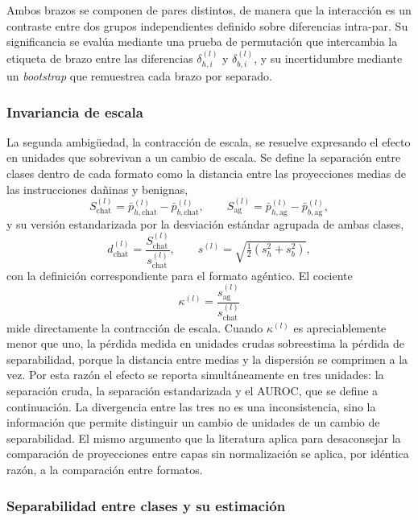 \documentclass[12pt,a4paper]{article}
\newcommand{\parencite}[1]{\citep{#1}}
\begin{document}
Ambos brazos se componen de pares distintos, de manera que la interacción es un contraste entre dos grupos independientes definido sobre diferencias intra-par. Su significancia se evalúa mediante una prueba de permutación que intercambia la etiqueta de brazo entre las diferencias $\delta_{h,i}^{(l)}$ y $\delta_{b,i}^{(l)}$, y su incertidumbre mediante un \textit{bootstrap} que remuestrea cada brazo por separado.

\subsubsection*{Invariancia de escala}

La segunda ambigüedad, la contracción de escala, se resuelve expresando el efecto en unidades que sobrevivan a un cambio de escala. Se define la separación entre clases dentro de cada formato como la distancia entre las proyecciones medias de las instrucciones dañinas y benignas,
\[
S^{(l)}_{\text{chat}} = \bar{p}^{(l)}_{h,\text{chat}} - \bar{p}^{(l)}_{b,\text{chat}},
\qquad
S^{(l)}_{\text{ag}} = \bar{p}^{(l)}_{h,\text{ag}} - \bar{p}^{(l)}_{b,\text{ag}},
\]
y su versión estandarizada por la desviación estándar agrupada de ambas clases,
\[
d^{(l)}_{\text{chat}} = \frac{S^{(l)}_{\text{chat}}}{s^{(l)}_{\text{chat}}},
\qquad
s^{(l)} = \sqrt{\tfrac{1}{2}\left( s_{h}^{2} + s_{b}^{2} \right)},
\]
con la definición correspondiente para el formato agéntico. El cociente
\[
\kappa^{(l)} = \frac{s^{(l)}_{\text{ag}}}{s^{(l)}_{\text{chat}}}
\]
mide directamente la contracción de escala. Cuando $\kappa^{(l)}$ es apreciablemente menor que uno, la pérdida medida en unidades crudas sobreestima la pérdida de separabilidad, porque la distancia entre medias y la dispersión se comprimen a la vez. Por esta razón el efecto se reporta simultáneamente en tres unidades: la separación cruda, la separación estandarizada y el AUROC, que se define a continuación. La divergencia entre las tres no es una inconsistencia, sino la información que permite distinguir un cambio de unidades de un cambio de separabilidad. El mismo argumento que la literatura aplica para desaconsejar la comparación de proyecciones entre capas sin normalización \parencite{arditi2024} se aplica, por idéntica razón, a la comparación entre formatos.

\subsubsection*{Separabilidad entre clases y su estimación}
\end{document}
